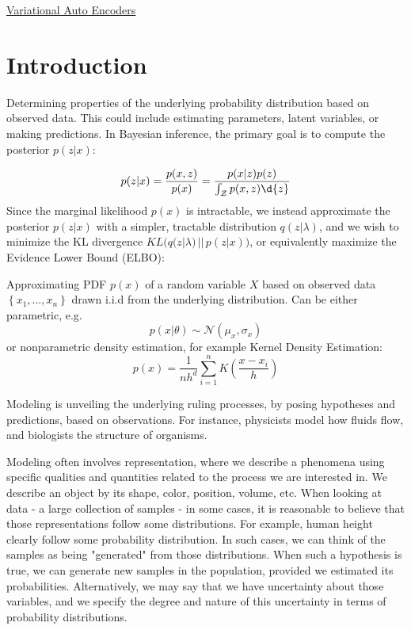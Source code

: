 \documentclass{article}
\begin{document}
\begin{center}
{\huge \underline{Variational Auto Encoders}}
\end{center}
\section{Introduction}
\begin{definition} Determining properties of the underlying probability distribution based on observed data. This could include estimating parameters, latent variables, or making predictions. In Bayesian inference, the primary goal is to compute the posterior $p(z|x)$:

\[
  p(z|x) = \frac{p(x,z)}{p(x)} = \frac{p(x|z) p(z)}{\int_{\mathcal{Z}} p(x,z) \d{z} }
\]
  Since the marginal likelihood $p(x)$ is intractable, we instead approximate the posterior $p(z|x)$ with a simpler, tractable distribution $q(z| \lambda)$, and we wish to minimize the KL divergence $KL \Big( q(z | \lambda) \, || \, p(z | x) \Big)$, or equivalently maximize the Evidence Lower Bound (ELBO):


\end{definition}
\begin{definition} Approximating PDF $p(x)$ of a random variable $X$ based on observed data $\left\{ x_1, \ldots, x_n \right\}$ drawn i.i.d from the underlying distribution. Can be either parametric, e.g.
\[
  p(x | \theta) \sim  \mathcal{N}( \mu_x, \sigma_x)
\]
or nonparametric density estimation, for example Kernel Density Estimation:
\[
  p(x) = \frac{1}{n h^{d}} \sum_{i=1}^{n} K \left( \frac{x-x_i}{h} \right) 
\]
\end{definition}
\begin{definition}[Modeling] Modeling is unveiling the underlying ruling processes, by posing hypotheses and predictions, based on observations. For instance, physicists model how fluids flow, and biologists the  structure of organisms. 

Modeling often involves representation, where we describe a phenomena using specific qualities and quantities related to the process we are interested in. We describe an object by its shape, color, position, volume, etc. 
When looking at data - a large collection of samples - in some cases, it is reasonable to believe that those representations follow some distributions. For example, human height clearly follow some probability distribution. In such cases, we can think of the samples as being "generated" from those distributions. When such a hypothesis is true, we can generate new samples in the population, provided we estimated its probabilities. Alternatively, we may say that we have uncertainty about those variables, and we specify the degree and nature of this uncertainty  in terms of probability distributions.  
\end{definition}
\end{document}
